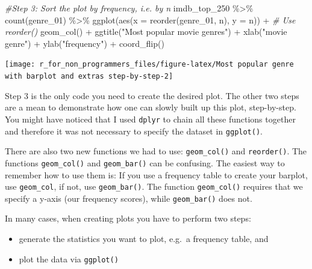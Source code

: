 \documentclass[
]{book}
\newenvironment{Shaded}{\begin{snugshade}}{\end{snugshade}}
\newcommand{\AttributeTok}[1]{\textcolor[rgb]{0.77,0.63,0.00}{#1}}
\newcommand{\CommentTok}[1]{\textcolor[rgb]{0.56,0.35,0.01}{\textit{#1}}}
\newcommand{\FunctionTok}[1]{\textcolor[rgb]{0.00,0.00,0.00}{#1}}
\newcommand{\NormalTok}[1]{#1}
\newcommand{\SpecialCharTok}[1]{\textcolor[rgb]{0.00,0.00,0.00}{#1}}
\newcommand{\StringTok}[1]{\textcolor[rgb]{0.31,0.60,0.02}{#1}}
\begin{document}
\begin{Shaded}
\begin{Highlighting}[]

\CommentTok{\#Step 3: Sort the plot by frequency, i.e. by \textquotesingle{}n\textquotesingle{}}
\NormalTok{imdb\_top\_250 }\SpecialCharTok{\%\textgreater{}\%} 
  \FunctionTok{count}\NormalTok{(genre\_01) }\SpecialCharTok{\%\textgreater{}\%} 
  \FunctionTok{ggplot}\NormalTok{(}\FunctionTok{aes}\NormalTok{(}\AttributeTok{x =} \FunctionTok{reorder}\NormalTok{(genre\_01, n), }\AttributeTok{y =}\NormalTok{ n)) }\SpecialCharTok{+}    \CommentTok{\# Use \textquotesingle{}reorder()\textquotesingle{}}
  \FunctionTok{geom\_col}\NormalTok{() }\SpecialCharTok{+}
  \FunctionTok{ggtitle}\NormalTok{(}\StringTok{"Most popular movie genres"}\NormalTok{) }\SpecialCharTok{+}
  \FunctionTok{xlab}\NormalTok{(}\StringTok{"movie genre"}\NormalTok{) }\SpecialCharTok{+}
  \FunctionTok{ylab}\NormalTok{(}\StringTok{"frequency"}\NormalTok{) }\SpecialCharTok{+}
  \FunctionTok{coord\_flip}\NormalTok{()}
\end{Highlighting}
\end{Shaded}

\begin{center}\texttt{[image: r\_for\_non\_programmers\_files/figure-latex/Most popular genre with barplot and extras step-by-step-2]} \end{center}

Step 3 is the only code you need to create the desired plot. The other two steps are a mean to demonstrate how one can slowly built up this plot, step-by-step. You might have noticed that I used \texttt{dplyr} to chain all these functions together and therefore it was not necessary to specify the dataset in \texttt{ggplot()}.

There are also two new functions we had to use: \texttt{geom\_col()} and \texttt{reorder()}. The functions \texttt{geom\_col()} and \texttt{geom\_bar()} can be confusing. The easiest way to remember how to use them is: If you use a frequency table to create your barplot, use \texttt{geom\_col}, if not, use \texttt{geom\_bar()}. The function \texttt{geom\_col()} requires that we specify a y-axis (our frequency scores), while \texttt{geom\_bar()} does not.

In many cases, when creating plots you have to perform two steps:

\begin{itemize}
\item
  generate the statistics you want to plot, e.g.~a frequency table, and
\item
  plot the data via \texttt{ggplot()}
\end{itemize}
\end{document}
